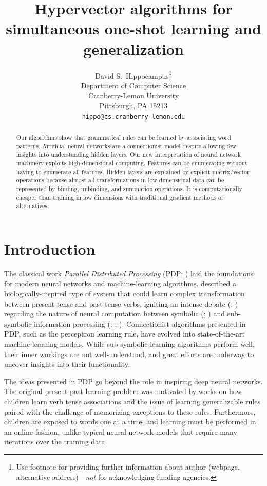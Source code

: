 \documentclass{article}
\title{Hypervector algorithms for simultaneous one-shot learning and generalization}
\author{
  David S.~Hippocampus\thanks{Use footnote for providing further
    information about author (webpage, alternative
    address)---\emph{not} for acknowledging funding agencies.} \\
  Department of Computer Science\\
  Cranberry-Lemon University\\
  Pittsburgh, PA 15213 \\
  \texttt{hippo@cs.cranberry-lemon.edu} \\
}
\begin{document}

\maketitle

\begin{abstract}
Our algorithms show that grammatical rules can be learned by associating word patterns. Artificial neural networks are a connectionist model despite allowing few insights into understanding hidden layers. Our new interpretation of neural network machinery exploits high-dimensional computing. Features can be enumerating without having to enumerate all features. Hidden layers are explained by explicit matrix/vector operations because almost all transformations in low dimensional data can be represented by binding, unbinding, and summation operations. It is computationally cheaper than training in low dimensions with traditional gradient methods or alternatives. %


\end{abstract}

\section{Introduction}

The classical work \emph{Parallel Distributed Processing} (PDP; \citet{McClelland1986}) laid the foundations for modern neural networks and machine-learning algorithms. 
\citet{Rumelhart1986a} described a biologically-inspired type of system that could learn complex transformation between present-tense and past-tense verbs, igniting an intense debate (\citet{Pinker1988}; \citet{Fodor1988}) regarding the nature of neural computation between symbolic (\citet{Pinker2002a}; \citet{Fodor1990}) and sub-symbolic information processing (\citet{MacWhinney1991}; \citet{Bullinaria1994}; \citet{McClelland2002}). Connectionist algorithms presented in PDP, such as the perceptron learning rule, have evolved into state-of-the-art machine-learning models. While sub-symbolic learning algorithms perform well, their inner workings are not well-understood, and great efforts are underway to uncover insights into their functionality.

The ideas presented in PDP go beyond the role in inspiring deep neural networks. The original present-past learning problem was motivated by works on how children learn verb tense associations and the issue of learning generalizable rules paired with the challenge of memorizing exceptions to these rules. Furthermore, children are exposed to words one at a time, and learning must be performed in an online fashion, unlike typical neural network models that require many iterations over the training data.
\end{document}
